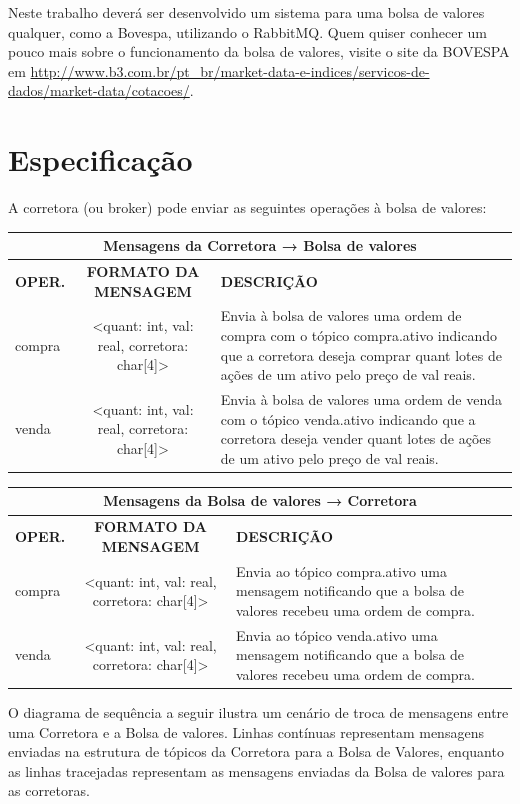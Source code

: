 \documentclass[12pt,brazil, a4paper, fullpage]{article}
\begin{document}
Neste trabalho deverá ser desenvolvido um sistema para uma bolsa de valores qualquer, como a Bovespa, utilizando o RabbitMQ. Quem quiser conhecer um pouco mais sobre o funcionamento da bolsa de valores, visite o site da BOVESPA em \url{http://www.b3.com.br/pt_br/market-data-e-indices/servicos-de-dados/market-data/cotacoes/}.


\section{Especificação}

\indent \indent A corretora (ou broker) pode enviar as seguintes operações à bolsa de valores:


\begin{tabular}{lcp{7.3cm}}
    \toprule
    \multicolumn{3}{c}{\textbf{Mensagens da Corretora → Bolsa de valores}} \\
    \midrule
    \textbf{OPER.} & \textbf{FORMATO DA MENSAGEM} & \textbf{DESCRIÇÃO} \\
    \midrule
    compra & <quant: int, val: real, corretora: char[4]> & Envia à bolsa de valores uma ordem de compra com o tópico compra.ativo indicando que a corretora deseja comprar quant lotes de ações de um ativo pelo preço de val reais. \\
    venda & <quant: int, val: real, corretora: char[4]> & Envia à bolsa de valores uma ordem de venda com o tópico venda.ativo indicando que a corretora deseja vender quant lotes de ações de um ativo pelo preço de val reais. \\
    \bottomrule
\end{tabular}%


\begin{tabular}{lcp{7.3cm}}
    \toprule
    \multicolumn{3}{c}{\textbf{Mensagens da Bolsa de valores → Corretora}} \\
    \midrule
    \textbf{OPER.} & \textbf{FORMATO DA MENSAGEM} & \textbf{DESCRIÇÃO} \\
    \midrule
    compra & <quant: int, val: real, corretora: char[4]> & Envia ao tópico compra.ativo uma mensagem notificando que a bolsa de valores recebeu uma ordem de compra. \\
    venda & <quant: int, val: real, corretora: char[4]> & Envia ao tópico venda.ativo uma mensagem notificando que a bolsa de valores recebeu uma ordem de compra. \\
    \bottomrule
\end{tabular}%


O diagrama de sequência a seguir ilustra um cenário de troca de mensagens entre uma Corretora e a Bolsa de valores. Linhas contínuas representam mensagens enviadas na estrutura de tópicos da Corretora para a Bolsa de Valores, enquanto as linhas tracejadas representam as mensagens enviadas da Bolsa de valores para as corretoras. \\
\end{document}
